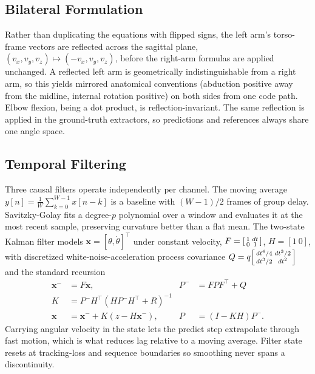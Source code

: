 \documentclass[conference]{IEEEtran}
\begin{document}
\subsection{Bilateral Formulation}
\label{sec:bilateral}
Rather than duplicating the equations with flipped signs, the left arm's
torso-frame vectors are reflected across the sagittal plane,
$(v_x,v_y,v_z)\mapsto(-v_x,v_y,v_z)$, before the right-arm formulas are
applied unchanged. A reflected left arm is geometrically
indistinguishable from a right arm, so this yields mirrored anatomical
conventions (abduction positive away from the midline, internal rotation
positive) on both sides from one code path. Elbow flexion, being a dot
product, is reflection-invariant. The same reflection is applied in the
ground-truth extractors, so predictions and references always share one
angle space.

\subsection{Temporal Filtering}
\label{sec:filtering}
Three causal filters operate independently per channel. The moving
average $y[n]=\frac1W\sum_{k=0}^{W-1}x[n-k]$ is a baseline with
$(W\!-\!1)/2$ frames of group delay. Savitzky-Golay
\cite{savitzky1964smoothing} fits a degree-$p$ polynomial over a window
and evaluates it at the most recent sample, preserving curvature better
than a flat mean. The two-state Kalman filter models
$\mathbf{x}=[\theta,\dot\theta]^{\!\top}$ under constant velocity,
$F=\begin{bsmallmatrix}1&dt\\0&1\end{bsmallmatrix}$, $H=[1\ 0]$, with
discretized white-noise-acceleration process covariance
$Q = q\begin{bsmallmatrix}dt^4/4 & dt^3/2\\ dt^3/2 & dt^2\end{bsmallmatrix}$
and the standard recursion
\begin{align}
\mathbf{x}^- &= F\mathbf{x}, & P^- &= FPF^{\!\top}+Q \\
K &= P^-H^{\!\top}(HP^-H^{\!\top}+R)^{-1} \\
\mathbf{x} &= \mathbf{x}^- + K(z-H\mathbf{x}^-), & P &= (I-KH)P^-.
\end{align}
Carrying angular velocity in the state lets the predict step extrapolate
through fast motion, which is what reduces lag relative to a moving
average. Filter state resets at tracking-loss and sequence boundaries so
smoothing never spans a discontinuity.
\end{document}
